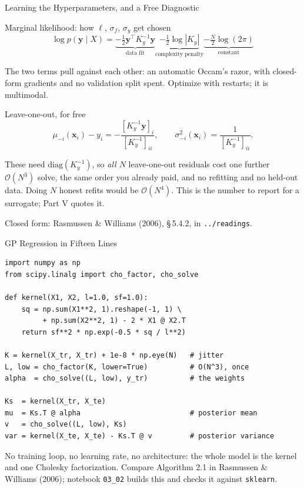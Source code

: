 \documentclass[aspectratio=169,11pt]{beamer}
\newcommand{\emphc}[1]{\textcolor{harvardcrimson}{#1}}
\newcommand{\x}{\bm{x}}
\begin{document}
\begin{frame}{Learning the Hyperparameters, and a Free Diagnostic}
\small
\begin{block}{Marginal likelihood: how $\ell$, $\sigma_f$, $\sigma_y$ get chosen}
\vspace{-6pt}
\[
\log p(\bm y \mid X) =
\underbrace{-\tfrac{1}{2}\bm y^\top K_y^{-1} \bm y}_{\text{data fit}}
\underbrace{-\tfrac{1}{2}\log|K_y|}_{\text{complexity penalty}}
\underbrace{-\tfrac{N}{2}\log(2\pi)}_{\text{constant}}
\]
\vspace{-8pt}

The two terms pull against each other: \emphc{an automatic Occam's razor}, with closed-form gradients and no validation split spent. Optimize with restarts; it is multimodal.
\end{block}

\vspace{0.08cm}
\begin{block}{Leave-one-out, for free}
\vspace{-6pt}
\[
\mu_{-i}(\x_i) - y_i = -\frac{[K_y^{-1}\bm y]_i}{[K_y^{-1}]_{ii}},
\qquad
\sigma^2_{-i}(\x_i) = \frac{1}{[K_y^{-1}]_{ii}} .
\]
\vspace{-8pt}

These need $\mathrm{diag}(K_y^{-1})$, so \emph{all $N$} leave-one-out residuals cost one further $\mathcal{O}(N^3)$ solve, the same order you already paid, and \emphc{no refitting and no held-out data}. Doing $N$ honest refits would be $\mathcal{O}(N^4)$. \emphc{This is the number to report for a surrogate}; Part V quotes it.
\end{block}

\vspace{0.1cm}
{\footnotesize Closed form: Rasmussen \& Williams (2006), \S\,5.4.2, in \texttt{../readings}.}
\end{frame}

\begin{frame}[fragile]{GP Regression in Fifteen Lines}
\begin{lstlisting}[basicstyle=\scriptsize\ttfamily]
import numpy as np
from scipy.linalg import cho_factor, cho_solve

def kernel(X1, X2, l=1.0, sf=1.0):
    sq = np.sum(X1**2, 1).reshape(-1, 1) \
         + np.sum(X2**2, 1) - 2 * X1 @ X2.T
    return sf**2 * np.exp(-0.5 * sq / l**2)

K = kernel(X_tr, X_tr) + 1e-8 * np.eye(N)   # jitter
L, low = cho_factor(K, lower=True)          # O(N^3), once
alpha  = cho_solve((L, low), y_tr)          # the weights

Ks  = kernel(X_tr, X_te)
mu  = Ks.T @ alpha                          # posterior mean
v   = cho_solve((L, low), Ks)
var = kernel(X_te, X_te) - Ks.T @ v         # posterior variance
\end{lstlisting}

\vspace{0.1cm}
{\footnotesize No training loop, no learning rate, no architecture: the whole model is the kernel and one Cholesky factorization. Compare Algorithm 2.1 in Rasmussen \& Williams (2006); notebook \texttt{03\_02} builds this and checks it against \texttt{sklearn}.}
\end{frame}
\end{document}
